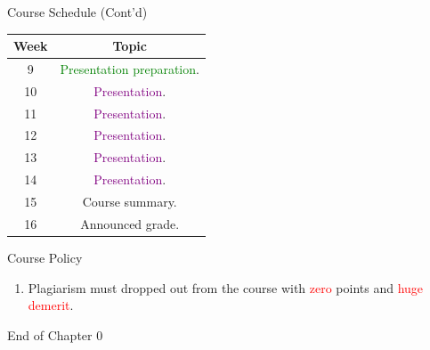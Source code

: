\documentclass{beamer}
\begin{document}
\begin{frame}{Course Schedule (Cont'd)}
\begin{center}
\begin{tabular}{|c|c|}
\hline
Week & Topic \\
\hline
9 & \textcolor{Green}{Presentation preparation}.\\
\hline
10 & \textcolor{purple}{Presentation}.\\
\hline
11 & \textcolor{purple}{Presentation}.\\
\hline
12 & \textcolor{purple}{Presentation}.\\
\hline
13 & \textcolor{purple}{Presentation}.\\
\hline
14 & \textcolor{purple}{Presentation}.\\
\hline
15 & Course summary.\\
\hline
16 & Announced grade.\\
\hline
\end{tabular}
\end{center}
\end{frame}
\begin{frame}{Course Policy}
\begin{enumerate}
\item Plagiarism must dropped out from the course with \textcolor{red}{zero} points and \textcolor{red}{huge demerit}. \\
\end{enumerate}
\end{frame}
\begin{frame}{}
\begin{center}
\Large{End of Chapter 0}
\end{center}
\end{frame}
\end{document}
